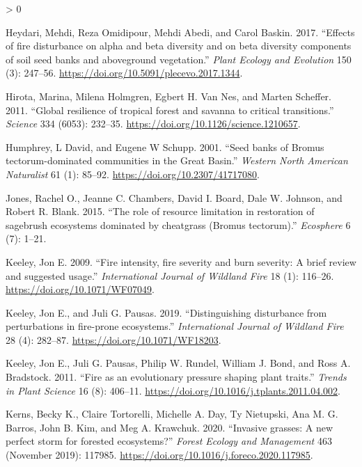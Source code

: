 \documentclass[
  12pt,
]{article}
\newlength{\cslhangindent}
\newenvironment{CSLReferences}[2] %
 {%
  \setlength{\parindent}{0pt}
  \ifodd #1 \everypar{\setlength{\hangindent}{\cslhangindent}}\ignorespaces\fi
  \ifnum #2 > 0
  \setlength{\parskip}{#2\baselineskip}
  \fi
 }%
 {}
\begin{document}
\begin{CSLReferences}{1}{0}
\leavevmode\hypertarget{ref-Heydari2017}{}%
Heydari, Mehdi, Reza Omidipour, Mehdi Abedi, and Carol Baskin. 2017.
{``{Effects of fire disturbance on alpha and beta diversity and on beta
diversity components of soil seed banks and aboveground vegetation}.''}
\emph{Plant Ecology and Evolution} 150 (3): 247--56.
\url{https://doi.org/10.5091/plecevo.2017.1344}.

\leavevmode\hypertarget{ref-Hirota2011}{}%
Hirota, Marina, Milena Holmgren, Egbert H. Van Nes, and Marten Scheffer.
2011. {``{Global resilience of tropical forest and savanna to critical
transitions}.''} \emph{Science} 334 (6053): 232--35.
\url{https://doi.org/10.1126/science.1210657}.

\leavevmode\hypertarget{ref-Humphrey2001}{}%
Humphrey, L David, and Eugene W Schupp. 2001. {``{Seed banks of Bromus
tectorum-dominated communities in the Great Basin}.''} \emph{Western
North American Naturalist} 61 (1): 85--92.
\url{https://doi.org/10.2307/41717080}.

\leavevmode\hypertarget{ref-Jones2015}{}%
Jones, Rachel O., Jeanne C. Chambers, David I. Board, Dale W. Johnson,
and Robert R. Blank. 2015. {``{The role of resource limitation in
restoration of sagebrush ecosystems dominated by cheatgrass (Bromus
tectorum)}.''} \emph{Ecosphere} 6 (7): 1--21.

\leavevmode\hypertarget{ref-Keeley2009}{}%
Keeley, Jon E. 2009. {``{Fire intensity, fire severity and burn
severity: A brief review and suggested usage}.''} \emph{International
Journal of Wildland Fire} 18 (1): 116--26.
\url{https://doi.org/10.1071/WF07049}.

\leavevmode\hypertarget{ref-Keeley2019}{}%
Keeley, Jon E., and Juli G. Pausas. 2019. {``{Distinguishing disturbance
from perturbations in fire-prone ecosystems}.''} \emph{International
Journal of Wildland Fire} 28 (4): 282--87.
\url{https://doi.org/10.1071/WF18203}.

\leavevmode\hypertarget{ref-Keeley2011}{}%
Keeley, Jon E., Juli G. Pausas, Philip W. Rundel, William J. Bond, and
Ross A. Bradstock. 2011. {``{Fire as an evolutionary pressure shaping
plant traits}.''} \emph{Trends in Plant Science} 16 (8): 406--11.
\url{https://doi.org/10.1016/j.tplants.2011.04.002}.

\leavevmode\hypertarget{ref-Kerns2020}{}%
Kerns, Becky K., Claire Tortorelli, Michelle A. Day, Ty Nietupski, Ana
M. G. Barros, John B. Kim, and Meg A. Krawchuk. 2020. {``{Invasive
grasses: A new perfect storm for forested ecosystems?}''} \emph{Forest
Ecology and Management} 463 (November 2019): 117985.
\url{https://doi.org/10.1016/j.foreco.2020.117985}.


\end{CSLReferences}
\end{document}
